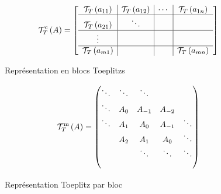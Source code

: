 \documentclass[journal,onecolumn]{IEEEtran}
\begin{document}
\begin{figure}[h!]
\begin{equation}
\mathcal{T}_{T}^\mathrm{c} \left( A \right)  = 
\left[\begin{array}{c|c|c|c}
\mathcal{T}_{T} \left( a_{11} \right) & \mathcal{T}_{T} \left( a_{12} \right) & \cdots  & \mathcal{T}_{T} \left( a_{1n} \right)\\ \hline
\mathcal{T}_{T} \left( a_{21} \right) & \ddots  & & \\ \hline
\vdots &  & & \\ \hline
\mathcal{T}_{T} \left( a_{m1} \right) & & &  \mathcal{T}_{T} \left( a_{mn} \right)   \\
\end{array} \right] 
\end{equation} 
\caption*{Représentation en blocs Toeplitzs }
\end{figure}


\begin{figure}[h!]
\begin{align}
    \mathcal{T}_{T}^\mathrm{m} \left( A \right) = \begin{pmatrix}
    \ddots & \ddots &  \ddots &  \\
        \ddots&A_0 & A_{-1} & A_{-2} \\
        \ddots &A_1 & A_{0} & A_{-1}&\ddots \\
        &A_2 & A_{1} & A_{0} &\ddots\\
        &&\ddots &\ddots &\ddots\\       
        & &  &  
    \end{pmatrix}
    \end{align}
\caption*{Représentation Toeplitz par bloc }
\end{figure}
\end{document}
